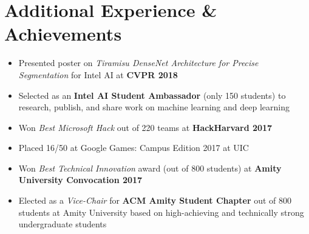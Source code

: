 \documentclass[letterpaper,10pt]{article}
\newcommand{\resumeSubHeadingListStart}{\begin{itemize}[leftmargin=*]}
\newcommand{\resumeSubHeadingListEnd}{\end{itemize}}
\newcommand{\shorterSection}[1]{\vspace{-10pt}\section{#1}}
\begin{document}
\shorterSection{Additional Experience \& Achievements}
  \resumeSubHeadingListStart
  \small
    \item{Presented poster on \textit{Tiramisu DenseNet Architecture for Precise Segmentation} for Intel AI at \textbf{CVPR 2018}}
    \vspace{-5pt}
    \item{Selected as an \textbf{Intel AI Student Ambassador} (only 150 students) to research, publish, and share work on machine learning and deep learning}
    \vspace{-5pt}
    \item{Won \textit{Best Microsoft Hack} out of 220 teams at \textbf{HackHarvard 2017}}
    \vspace{-5pt}
    \item{Placed 16/50 at Google Games: Campus Edition 2017 at UIC}
    \vspace{-5pt}
    \item{Won \textit{Best Technical Innovation} award (out of 800 students) at \textbf{Amity University Convocation 2017}}
    \vspace{-5pt}
    \item{Elected as a \textit{Vice-Chair} for \textbf{ACM Amity Student Chapter} out of 800 students at Amity University based on high-achieving and technically strong undergraduate students}
  \resumeSubHeadingListEnd
\end{document}
